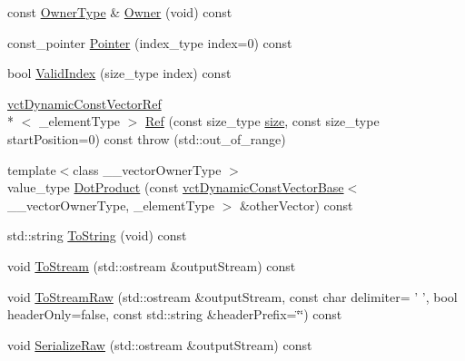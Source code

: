 \begin{DoxyCompactItemize}
\item 
const \hyperlink{classvct_dynamic_const_vector_base_a6d92548fcc7076cbd4c091ceb0faf364}{Owner\-Type} \& \hyperlink{classvct_dynamic_const_vector_base_abc25ad1a425d8b221e3409092b89be68}{Owner} (void) const 
\item 
const\-\_\-pointer \hyperlink{classvct_dynamic_const_vector_base_ad78506ee5fdadb7c879ed4a5a57278e6}{Pointer} (index\-\_\-type index=0) const 
\item 
bool \hyperlink{classvct_dynamic_const_vector_base_a0329d61eeff85f488a78d065a3d092e2}{Valid\-Index} (size\-\_\-type index) const 
\item 
\hyperlink{classvct_dynamic_const_vector_ref}{vct\-Dynamic\-Const\-Vector\-Ref}\\*
$<$ \-\_\-element\-Type $>$ \hyperlink{classvct_dynamic_const_vector_base_a15253c5d34a27d85bcc7aa730e9aae93}{Ref} (const size\-\_\-type \hyperlink{classvct_dynamic_const_vector_base_a79950d8cced7fd4e790d9ac2ca1c43a7}{size}, const size\-\_\-type start\-Position=0) const   throw (std\-::out\-\_\-of\-\_\-range)
\item 
{\footnotesize template$<$class \-\_\-\-\_\-vector\-Owner\-Type $>$ }\\value\-\_\-type \hyperlink{classvct_dynamic_const_vector_base_a802f2332971a128c372a0f08bf0c405b}{Dot\-Product} (const \hyperlink{classvct_dynamic_const_vector_base}{vct\-Dynamic\-Const\-Vector\-Base}$<$ \-\_\-\-\_\-vector\-Owner\-Type, \-\_\-element\-Type $>$ \&other\-Vector) const 
\item 
std\-::string \hyperlink{classvct_dynamic_const_vector_base_a8ce660be7546ef58a69161493b92ce17}{To\-String} (void) const 
\item 
void \hyperlink{classvct_dynamic_const_vector_base_af7c7a1230789a78079b4c27dd5a16f1f}{To\-Stream} (std\-::ostream \&output\-Stream) const 
\item 
void \hyperlink{classvct_dynamic_const_vector_base_a56e9eb24d9eb1a98905394c530609bf7}{To\-Stream\-Raw} (std\-::ostream \&output\-Stream, const char delimiter= ' ', bool header\-Only=false, const std\-::string \&header\-Prefix=\char`\"{}\char`\"{}) const 
\item 
void \hyperlink{classvct_dynamic_const_vector_base_af6641f0af4fedb1441b48639251fcbba}{Serialize\-Raw} (std\-::ostream \&output\-Stream) const 
\end{DoxyCompactItemize}
